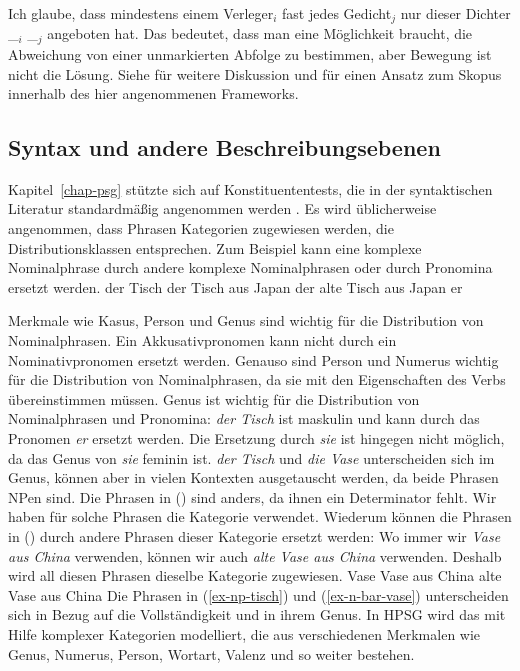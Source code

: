 \ea
Ich glaube, dass mindestens einem Verleger$_i$ fast jedes Gedicht$_j$ nur dieser Dichter \_$_i$ \_$_j$ angeboten hat.
\z
\noindent
Das bedeutet, dass man eine Möglichkeit braucht, die Abweichung von einer unmarkierten Abfolge zu bestimmen, aber
Bewegung ist nicht die Lösung. Siehe  für weitere Diskussion und
\citet{Kiss2001a} für einen Ansatz zum Skopus innerhalb des hier angenommenen Frameworks.%

\subsection{Syntax und andere Beschreibungsebenen}
\label{sec-down-to-earth-syntax}

Kapitel~\ref{chap-psg} stützte sich auf Konstituententests, die in der syntaktischen
Literatur standardmäßig angenommen werden \parencites[24--31]{Borsley91a}[35--36]{Haegeman94a-u}[20--23]{HP2002a-ed}[29--33]{SWB2003a}[19--22]{KS2008a-u}[Abschnitt~1.3]{MuellerGT-Eng}{MyP2022a}.
Es wird üblicherweise angenommen, dass Phrasen Kategorien zugewiesen werden, die Distributionsklassen entsprechen. Zum Beispiel kann eine komplexe Nominalphrase durch andere komplexe Nominalphrasen oder durch
Pronomina ersetzt werden.
\eal
\label{ex-np-tisch}
\ex der Tisch
\ex der Tisch aus Japan
\ex der alte Tisch aus Japan
\ex er
\zl

\noindent
Merkmale wie Kasus, Person und Genus sind wichtig für die Distribution von Nominalphrasen. Ein Akkusativpronomen kann nicht durch ein Nominativpronomen ersetzt werden. Genauso sind Person und
Numerus wichtig für die Distribution von Nominalphrasen, da sie mit den Eigenschaften des
Verbs übereinstimmen müssen. Genus ist wichtig für die Distribution von Nominalphrasen und Pronomina:
\emph{der Tisch} ist maskulin und kann durch das Pronomen \emph{er} ersetzt werden. Die Ersetzung
durch \emph{sie} ist hingegen nicht möglich, da das Genus von \emph{sie} feminin ist. \emph{der Tisch} und
\emph{die Vase} unterscheiden sich im Genus, können aber in vielen Kontexten ausgetauscht werden, da beide
Phrasen NPen sind. Die Phrasen in () sind anders, da ihnen ein
Determinator fehlt. Wir haben für solche Phrasen die Kategorie \nbar{} verwendet. Wiederum können die Phrasen in () durch
andere Phrasen dieser Kategorie ersetzt werden: Wo immer wir \emph{Vase aus China} verwenden, können wir auch
\emph{alte Vase aus China} verwenden. Deshalb wird all diesen Phrasen dieselbe Kategorie zugewiesen.
\eal
\label{ex-n-bar-vase}
\ex Vase
\ex Vase aus China
\ex alte Vase aus China
\zl
Die Phrasen in (\ref{ex-np-tisch}) und (\ref{ex-n-bar-vase}) unterscheiden sich in Bezug auf die Vollständigkeit und in
ihrem Genus. In HPSG wird das mit Hilfe komplexer Kategorien modelliert, die aus verschiedenen
Merkmalen wie Genus, Numerus, Person, Wortart, Valenz und so weiter bestehen.

